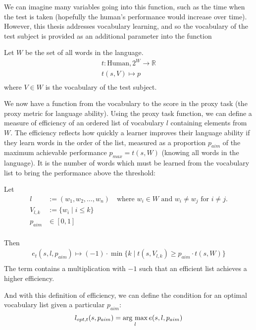 We can imagine many variables going into this function, such as the time when the test is taken (hopefully the human's performance would increase over time). However, this thesis addresses vocabulary learning, and so the vocabulary of the test subject is provided as an additional parameter into the function

Let $W$ be the set of all words in the language.
\begin{align*}
	t: \text{Human}, 2^{W}\to \mathbb{R} \\
	t (s, V) \mapsto p                   \\
\end{align*}
where $V \in W$ is the vocabulary of the test subject.

We now have a function from the vocabulary to the score in the proxy task (the proxy metric for language ability).
Using the proxy task function, we can define a measure of efficiency of an ordered list of vocabulary $l$ containing elements from $W$.
The efficiency reflects how quickly a learner improves their language ability if they learn words in the order of the list, measured as a proportion $p_{aim}$ of the maximum achievable performance $p_{max} = t(s,W)$ (knowing all words in the language).
It is the number of words which must be learned from the vocabulary list to bring the performance above the threshold:

Let
\begin{align*}
	l        & := (w_1, w_2, \dots, w_n) \quad \text{where } w_i \in W \text{ and } w_i \neq w_j \text{ for } i \neq j. \\
	V_{l, k} & := \{w_i \mid i \leq k\}                                                                                 \\
	p_{aim}  & \in  [0, 1]                                                                                              \\
\end{align*}

Then
\begin{align*}
	e_{t}(s, l, p_{aim}) \mapsto ( -1 )  \cdot  \min\{ k \mid  t(s,  V_{l, k}) \geq p_{aim} \cdot t(s, W)\} \\
\end{align*}
The term contains a multiplication with $-1$ such that an efficient list achieves a higher efficiency.

And with this definition of efficiency, we can define the condition for an optimal vocabulary list given a particular $p_{aim}$:
\begin{align} \label{eq:opt-vocab-list}
	l_{opt, t} (s, p_{aim}) = \mathop{\rm arg~max}\limits_{l} e(s, l, p_{aim})
\end{align}

